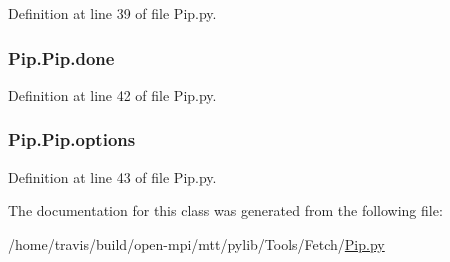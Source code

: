 Definition at line 39 of file Pip.\-py.

\hypertarget{class_pip_1_1_pip_adaa42730d39533e28bf8f74c8de40110}{
\subsubsection[{done}]{\setlength{\rightskip}{0pt plus 5cm}Pip.\-Pip.\-done}}\label{class_pip_1_1_pip_adaa42730d39533e28bf8f74c8de40110}


Definition at line 42 of file Pip.\-py.

\hypertarget{class_pip_1_1_pip_a81ef2ef6560b4befa1626bedb3fe96da}{
\subsubsection[{options}]{\setlength{\rightskip}{0pt plus 5cm}Pip.\-Pip.\-options}}\label{class_pip_1_1_pip_a81ef2ef6560b4befa1626bedb3fe96da}


Definition at line 43 of file Pip.\-py.



The documentation for this class was generated from the following file\-:\begin{DoxyCompactItemize}
\item 
/home/travis/build/open-\/mpi/mtt/pylib/\-Tools/\-Fetch/\hyperlink{_pip_8py}{Pip.\-py}\end{DoxyCompactItemize}
